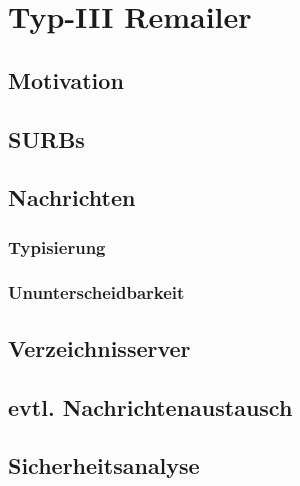 \chapter{Typ-III Remailer}

\section{Motivation}

\section{SURBs}

\section{Nachrichten}
\subsection{Typisierung}
\subsection{Ununterscheidbarkeit}

\section{Verzeichnisserver}

\section{evtl. Nachrichtenaustausch}

\section{Sicherheitsanalyse}


